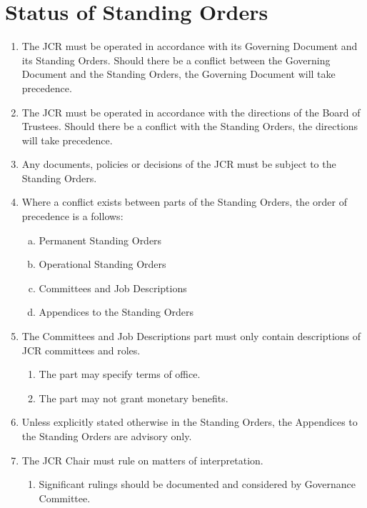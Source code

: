 \documentclass[12pt]{article}
\begin{document}
\section{Status of Standing Orders}
\begin{enumerate}
    \item The JCR must be operated in accordance with its Governing Document and its Standing Orders. Should there be a conflict between the Governing Document and the Standing Orders, the Governing Document will take precedence.
    \item The JCR must be operated in accordance with the directions of the Board of Trustees. Should there be a conflict with the Standing Orders, the directions will take precedence.
    \item Any documents, policies or decisions of the JCR must be subject to the Standing Orders.
    \item Where a conflict exists between parts of the Standing Orders, the order of precedence is a follows:
    \begin{enumerate}[(a)]
        \item Permanent Standing Orders
        \item Operational Standing Orders
        \item Committees and Job Descriptions
        \item Appendices to the Standing Orders
    \end{enumerate}
    \item The Committees and Job Descriptions part must only contain descriptions of JCR committees and roles.
    \begin{enumerate}
        \item The part may specify terms of office.
        \item The part may not grant monetary benefits.
    \end{enumerate}
    \item Unless explicitly stated otherwise in the Standing Orders, the Appendices to the Standing Orders are advisory only.
    \item The JCR Chair must rule on matters of interpretation.
    \begin{enumerate}
        \item Significant rulings should be documented and considered by Governance Committee.
    \end{enumerate}
\end{enumerate}
\newpage
\end{document}
